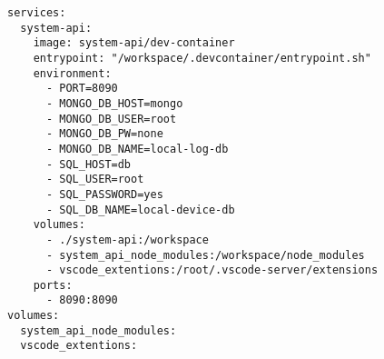 
\begin{lstlisting}[language=docker-compose-2,caption={Auxiliary Services \code{docker-compose.yml}},breaklines=true,label={code::compose_service}]
services:
  system-api:
    image: system-api/dev-container
    entrypoint: "/workspace/.devcontainer/entrypoint.sh"
    environment:
      - PORT=8090
      - MONGO_DB_HOST=mongo
      - MONGO_DB_USER=root
      - MONGO_DB_PW=none
      - MONGO_DB_NAME=local-log-db
      - SQL_HOST=db
      - SQL_USER=root
      - SQL_PASSWORD=yes
      - SQL_DB_NAME=local-device-db
    volumes:
      - ./system-api:/workspace
      - system_api_node_modules:/workspace/node_modules
      - vscode_extentions:/root/.vscode-server/extensions
    ports:
      - 8090:8090
volumes:
  system_api_node_modules:
  vscode_extentions:
\end{lstlisting}
